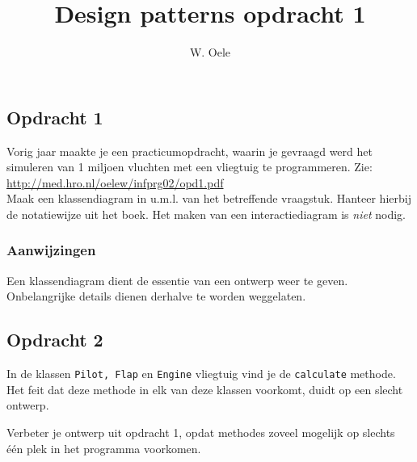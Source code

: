 \documentclass[fleqn,11pt]{article}
\title{Design patterns opdracht 1}
\author{W. Oele}
\begin{document}
\sffamily
\maketitle
\newpage
\subsection*{Opdracht 1}
Vorig jaar maakte je een practicumopdracht, waarin je gevraagd werd het simuleren van 1 miljoen vluchten met een vliegtuig te programmeren. Zie: \href{http://med.hro.nl/oelew/infprg02/opd1.pdf}{http://med.hro.nl/oelew/infprg02/opd1.pdf}\\ 

Maak een klassendiagram in u.m.l. van het betreffende vraagstuk. Hanteer hierbij de notatiewijze uit het boek. Het maken van een interactiediagram is \emph{niet} nodig.

\subsubsection*{Aanwijzingen}
Een klassendiagram dient de essentie van een ontwerp weer te geven. Onbelangrijke details dienen derhalve te worden weggelaten. 
\subsection*{Opdracht 2}
In de klassen \verb|Pilot, Flap| en \verb|Engine|  vliegtuig vind je de \verb|calculate| methode. Het feit dat deze methode in elk van deze klassen voorkomt, duidt op een slecht ontwerp.  

Verbeter je ontwerp uit opdracht 1, opdat methodes zoveel mogelijk op slechts \'e\'en plek in het programma voorkomen. 

\end{document}
